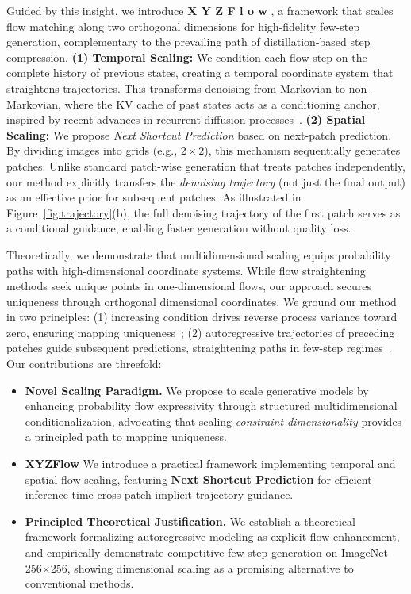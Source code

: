 \documentclass{article}
\theoremstyle{plain}
\theoremstyle{definition}
\theoremstyle{remark}
\newcommand{\XYZFlow}{%
    \textcolor{blue!40!purple!60}{X}%
    \textcolor{cyan!40!green!50}{Y}%
    \textcolor{yellow!40!orange}{Z}%
    \textcolor{blue!65!black}{F}%
    \textcolor{cyan!60!black}{l}%
    \textcolor{green!55!black}{o}%
    \textcolor{yellow!65!black}{w}%
}
\begin{document}
Guided by this insight, we introduce \textbf{\XYZFlow}, a framework that scales flow matching along two orthogonal dimensions for high-fidelity few-step generation, complementary to the prevailing path of distillation-based step compression. \textbf{(1) Temporal Scaling:} We condition each flow step on the complete history of previous states, creating a temporal coordinate system that straightens trajectories. This transforms denoising from Markovian to non-Markovian, where the KV cache of past states acts as a conditioning anchor, inspired by recent advances in recurrent diffusion processes~\cite{far}. \textbf{(2) Spatial Scaling:} We propose \textit{Next Shortcut Prediction} based on next-patch prediction. By dividing images into grids (e.g., $2\times2$), this mechanism sequentially generates patches. Unlike standard patch-wise generation that treats patches independently, our method explicitly transfers the \emph{denoising trajectory} (not just the final output) as an effective prior for subsequent patches. As illustrated in Figure~\ref{fig:trajectory}(b), the full denoising trajectory of the first patch serves as a conditional guidance, enabling faster generation without quality loss. 

Theoretically, we demonstrate that multidimensional scaling equips probability paths with high-dimensional coordinate systems. While flow straightening methods seek unique points in one-dimensional flows, our approach secures uniqueness through orthogonal dimensional coordinates. We ground our method in two principles: (1) increasing condition drives reverse process variance toward zero, ensuring mapping uniqueness~\cite{cm,ict,ect,scm,yang2024consistency}; (2) autoregressive trajectories of preceding patches guide subsequent predictions, straightening paths in few-step regimes~\cite{far,lazymar,speculative_mar,ren2024flowar}. Our contributions are threefold:

\vspace{-3mm}

\begin{itemize}
\setlength\itemsep{0.37em}
    \item \textbf{Novel Scaling Paradigm.} We propose to scale generative models by enhancing probability flow expressivity through structured multidimensional conditionalization, advocating that scaling \textit{constraint dimensionality} provides a principled path to mapping uniqueness.
    
    \item \textbf{XYZFlow} We introduce a practical framework implementing temporal and spatial flow scaling, featuring \textbf{Next Shortcut Prediction} for efficient inference-time cross-patch implicit trajectory guidance.
    
    \item \textbf{Principled Theoretical Justification.} We establish a theoretical framework formalizing autoregressive modeling as explicit flow enhancement, and empirically demonstrate competitive few-step generation on ImageNet 256$\times$256, showing dimensional scaling as a promising alternative to conventional methods.
\end{itemize}
\end{document}
